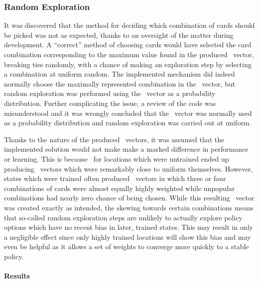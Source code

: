 
\subsubsection*{Random Exploration}
\label{sec:findings-expts-rand}

It was discovered that the method for deciding which combination of cards
should be picked was not as expected,
thanks to an oversight of the matter during development.
%
A ``correct'' method of choosing cards would have selected the card combination
corresponding to the maximum value found in the produced \pvec\ vector,
breaking ties randomly,
with a chance of making an exploration step by selecting a combination at
uniform random.
%
The implemented mechanism did indeed normally choose the maximally represented
combination in the \pvec\ vector,
but random exploration was performed using the \pvec\ vector as a probability
distribution.
%
Further complicating the issue,
a review of the code was misunderstood and it was wrongly concluded that
the \pvec\ vector was normally used as a probability distribution
and random exploration was carried out at uniform.

Thanks to the nature of the produced \pvec\ vectors,
it was assumed that the implemented solution would not make make a marked
difference in performance or learning.
%
This is because \pvec\ for locations which were untrained 
ended up producing \pvec\ vectors which were remarkably close to
uniform themselves.
%
However,
states which were trained often produced \pvec\ vectors in which
three or four combinations of cards were almost equally highly weighted
while unpopular combinations had nearly zero chance of being chosen.
%
While this resulting \pvec\ vector was created exactly as intended,
the skewing towards certain combinations means that so-called
random exploration steps are unlikely to actually explore policy options
which have no recent bias
in later, trained states.
%
This may result in only a negligible effect since
only highly trained locations will show this bias
and may even be helpful as it allows a set of weights to converge more quickly
to a stable policy.


\paragraph*{Results}
\label{sec:findings-expts-rand-results}


